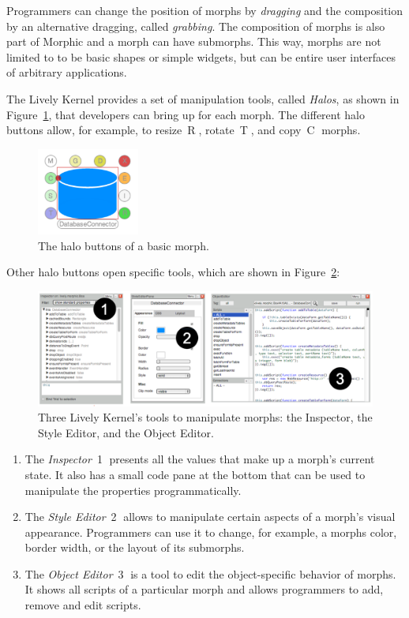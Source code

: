 Programmers can change the position of morphs by \emph{dragging} and the composition by an alternative dragging, called \emph{grabbing}.
The composition of morphs is also part of Morphic and a morph can have submorphs.
This way, morphs are not limited to to be basic shapes or simple widgets, but can be entire user interfaces of arbitrary applications.

The Lively Kernel provides a set of manipulation tools, called \emph{Halos}, as shown in Figure~\ref{fig:Halos}, that developers can bring up for each morph.
The different halo buttons allow, for example, to resize~\textcircled{R}, rotate~\textcircled{T}, and copy~\textcircled{C} morphs.

\begin{figure}[h]
    \centering
    \includegraphics[width=0.3\textwidth]{figures/2_background/1_halos.pdf}
    \caption{The halo buttons of a basic morph.}
    \label{fig:Halos}
\end{figure}

Other halo buttons open specific tools, which are shown in Figure~\ref{fig:LivelyTools}:

\begin{figure}[h]
    \centering
    \includegraphics[width=\textwidth]{figures/2_background/2_LivelyTools.pdf}
    \caption{Three Lively Kernel's tools to manipulate morphs: the Inspector, the Style Editor, and the Object Editor.}
    \label{fig:LivelyTools}
\end{figure}

\begin{enumerate}
    \item The \emph{Inspector}~\textcircled{1} presents all the values that make up a morph's current state. It also has a small code pane at the bottom that can be used to manipulate the properties programmatically.
    \item The \emph{Style Editor}~\textcircled{2} allows to manipulate certain aspects of a morph's visual appearance. Programmers can use it to change, for example, a morphs color, border width, or the layout of its submorphs.
    \item The \emph{Object Editor}~\textcircled{3} is a tool to edit the object-specific behavior of morphs. It shows all scripts of a particular morph and allows programmers to add, remove and edit scripts.
\end{enumerate}


